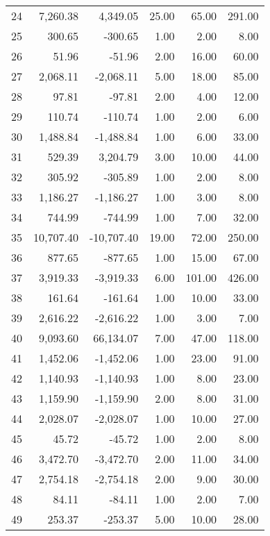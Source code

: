 \begin{tabular}{lrrrrr}
24 &  7,260.38 &   4,349.05 &  25.00 &  65.00 &       291.00 \\
25 &    300.65 &    -300.65 &   1.00 &   2.00 &         8.00 \\
26 &     51.96 &     -51.96 &   2.00 &  16.00 &        60.00 \\
27 &  2,068.11 &  -2,068.11 &   5.00 &  18.00 &        85.00 \\
28 &     97.81 &     -97.81 &   2.00 &   4.00 &        12.00 \\
29 &    110.74 &    -110.74 &   1.00 &   2.00 &         6.00 \\
30 &  1,488.84 &  -1,488.84 &   1.00 &   6.00 &        33.00 \\
31 &    529.39 &   3,204.79 &   3.00 &  10.00 &        44.00 \\
32 &    305.92 &    -305.89 &   1.00 &   2.00 &         8.00 \\
33 &  1,186.27 &  -1,186.27 &   1.00 &   3.00 &         8.00 \\
34 &    744.99 &    -744.99 &   1.00 &   7.00 &        32.00 \\
35 & 10,707.40 & -10,707.40 &  19.00 &  72.00 &       250.00 \\
36 &    877.65 &    -877.65 &   1.00 &  15.00 &        67.00 \\
37 &  3,919.33 &  -3,919.33 &   6.00 & 101.00 &       426.00 \\
38 &    161.64 &    -161.64 &   1.00 &  10.00 &        33.00 \\
39 &  2,616.22 &  -2,616.22 &   1.00 &   3.00 &         7.00 \\
40 &  9,093.60 &  66,134.07 &   7.00 &  47.00 &       118.00 \\
41 &  1,452.06 &  -1,452.06 &   1.00 &  23.00 &        91.00 \\
42 &  1,140.93 &  -1,140.93 &   1.00 &   8.00 &        23.00 \\
43 &  1,159.90 &  -1,159.90 &   2.00 &   8.00 &        31.00 \\
44 &  2,028.07 &  -2,028.07 &   1.00 &  10.00 &        27.00 \\
45 &     45.72 &     -45.72 &   1.00 &   2.00 &         8.00 \\
46 &  3,472.70 &  -3,472.70 &   2.00 &  11.00 &        34.00 \\
47 &  2,754.18 &  -2,754.18 &   2.00 &   9.00 &        30.00 \\
48 &     84.11 &     -84.11 &   1.00 &   2.00 &         7.00 \\
49 &    253.37 &    -253.37 &   5.00 &  10.00 &        28.00 \\
\bottomrule
\end{tabular}
